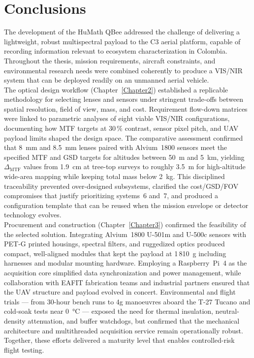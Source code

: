 ﻿\chapter{Conclusions}
\label{chap:conclusiones}

\noindent The development of the HuMath\textregistered{} QBee addressed the challenge of delivering a lightweight, robust multispectral payload to the C3 aerial platform, capable of recording information relevant to ecosystem characterization in Colombia. Throughout the thesis, mission requirements, aircraft constraints, and environmental research needs were combined coherently to produce a VIS/NIR system that can be deployed readily on an unmanned aerial vehicle.\\

\noindent The optical design workflow (Chapter~\ref{Chapter2}) established a replicable methodology for selecting lenses and sensors under stringent trade-offs between spatial resolution, field of view, mass, and cost. Requirement flow-down matrices were linked to parametric analyses of eight viable VIS/NIR configurations, documenting how MTF targets at 30\,\% contrast, sensor pixel pitch, and UAV payload limits shaped the design space. The comparative assessment confirmed that 8~mm and 8.5~mm lenses paired with Alvium~1800 sensors meet the specified MTF and GSD targets for altitudes between 50~m and 5~km, yielding $\Delta_{\mathrm{MTF}}$ values from 1.9~cm at tree-top surveys to roughly 3.5~m for high-altitude wide-area mapping while keeping total mass below 2~kg. This disciplined traceability prevented over-designed subsystems, clarified the cost/GSD/FOV compromises that justify prioritizing systems~6 and~7, and produced a configuration template that can be reused when the mission envelope or detector technology evolves.\\

\noindent Procurement and construction (Chapter~\ref{Chapter3}) confirmed the feasibility of the selected solution. Integrating Alvium~1800 U-501m and U-500c sensors with PET-G printed housings, spectral filters, and ruggedized optics produced compact, well-aligned modules that kept the payload at 1\,810~g including harnesses and modular mounting hardware. Employing a Raspberry~Pi~4 as the acquisition core simplified data synchronization and power management, while collaboration with EAFIT fabrication teams and industrial partners ensured that the UAV structure and payload evolved in concert. Environmental and flight trials --- from 30-hour bench runs to 4g manoeuvres aboard the T-27 Tucano and cold-soak tests near 0~\si{\celsius} --- exposed the need for thermal insulation, neutral-density attenuation, and buffer watchdogs, but confirmed that the mechanical architecture and multithreaded acquisition service remain operationally robust. Together, these efforts delivered a maturity level that enables controlled-risk flight testing.\\


